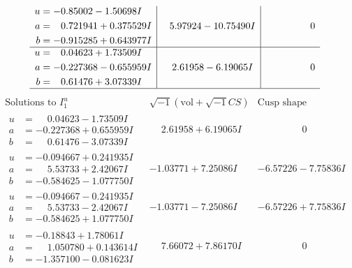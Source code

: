 \documentclass[1p]{elsarticle_modified}
\theoremstyle{definition}
\newcommand{\I}{\sqrt{-1}}
\begin{document}
$$\begin{array}{c|c|c}
\begin{aligned}
u &= -0.85002 - 1.50698 I \\
a &= \phantom{-}0.721941 + 0.375529 I \\
b &= -0.915285 + 0.643977 I\end{aligned}
 & \phantom{-}5.97924 - 10.75490 I & \phantom{-0.000000 } 0 \\ \hline\begin{aligned}
u &= \phantom{-}0.04623 + 1.73509 I \\
a &= -0.227368 - 0.655959 I \\
b &= \phantom{-}0.61476 + 3.07339 I\end{aligned}
 & \phantom{-}2.61958 - 6.19065 I & \phantom{-0.000000 } 0\\
 \hline 
 \end{array}$$\newpage$$\begin{array}{c|c|c}  
\text{Solutions to }I^u_{1}& \I (\text{vol} + \sqrt{-1}CS) & \text{Cusp shape}\\
 \hline 
\begin{aligned}
u &= \phantom{-}0.04623 - 1.73509 I \\
a &= -0.227368 + 0.655959 I \\
b &= \phantom{-}0.61476 - 3.07339 I\end{aligned}
 & \phantom{-}2.61958 + 6.19065 I & \phantom{-0.000000 } 0 \\ \hline\begin{aligned}
u &= -0.094667 + 0.241935 I \\
a &= \phantom{-}5.53733 + 2.42067 I \\
b &= -0.584625 - 1.077750 I\end{aligned}
 & -1.03771 + 7.25086 I & -6.57226 - 7.75836 I \\ \hline\begin{aligned}
u &= -0.094667 - 0.241935 I \\
a &= \phantom{-}5.53733 - 2.42067 I \\
b &= -0.584625 + 1.077750 I\end{aligned}
 & -1.03771 - 7.25086 I & -6.57226 + 7.75836 I \\ \hline\begin{aligned}
u &= -0.18843 + 1.78061 I \\
a &= \phantom{-}1.050780 + 0.143614 I \\
b &= -1.357100 - 0.081623 I\end{aligned}
 & \phantom{-}7.66072 + 7.86170 I & \phantom{-0.000000 } 0 \\ \hline\begin{aligned}

\end{aligned}
\end{array}$$
\end{document}

